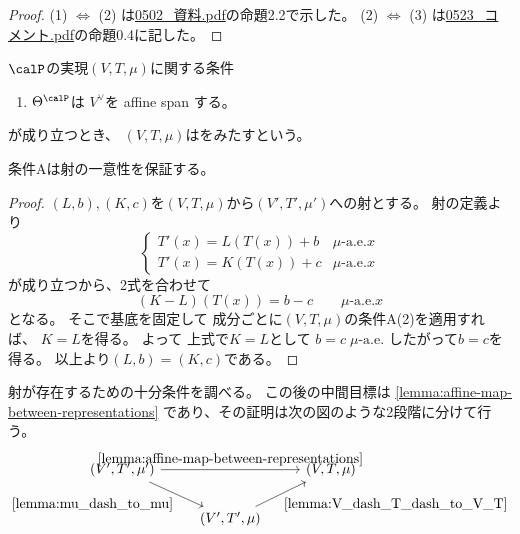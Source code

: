 \documentclass[report]{jlreq}
\begin{document}
\begin{proof}
    (1) $\iff$ (2) は\url{0502_資料.pdf}の命題2.2で示した。
    (2) $\iff$ (3) は\url{0523_コメント.pdf}の命題0.4に記した。
\end{proof}

\begin{definition}[条件B]
    $\calP$の実現$(V, T, \mu)$に関する条件
    \begin{enumerate}
        \item $\Theta^\calP$は
            $V^\vee$を affine span する。
    \end{enumerate}
    が成り立つとき、
    $(V, T, \mu)$はをみたすという。
\end{definition}

条件Aは射の一意性を保証する。


\begin{proof}
    $(L, b), (K, c)$を$(V, T, \mu)$から$(V', T', \mu')$への射とする。
    射の定義より
    \begin{equation}
        \begin{cases}
            T'(x) = L(T(x)) + b & \text{$\mu$-a.e.$x$} \\
            T'(x) = K(T(x)) + c & \text{$\mu$-a.e.$x$}
        \end{cases}
    \end{equation}
    が成り立つから、2式を合わせて
    \begin{equation}
        (K - L)(T(x)) = b - c \qquad \text{$\mu$-a.e.$x$}
    \end{equation}
    となる。
    そこで基底を固定して
    成分ごとに$(V, T, \mu)$の条件A(2)を適用すれば、
    $K = L$を得る。
    よって
    上式で$K = L$として
    $b = c \; \text{$\mu$-a.e.}$
    したがって$b = c$を得る。
    以上より$(L, b) = (K, c)$である。
\end{proof}

射が存在するための十分条件を調べる。
この後の中間目標は
\cref{lemma:affine-map-between-representations}
であり、その証明は次の図のような2段階に分けて行う。
\begin{equation}
    \begin{tikzcd}
        (V', T', \mu')
            \ar{rd}[swap]{\cref{lemma:mu_dash_to_mu}}
            \ar{rr}{\cref{lemma:affine-map-between-representations}}
            && (V, T, \mu)
            \\
        &(V', T', \mu)
            \ar{ru}[swap]{\cref{lemma:V_dash_T_dash_to_V_T}}
    \end{tikzcd}
\end{equation}
\end{document}
